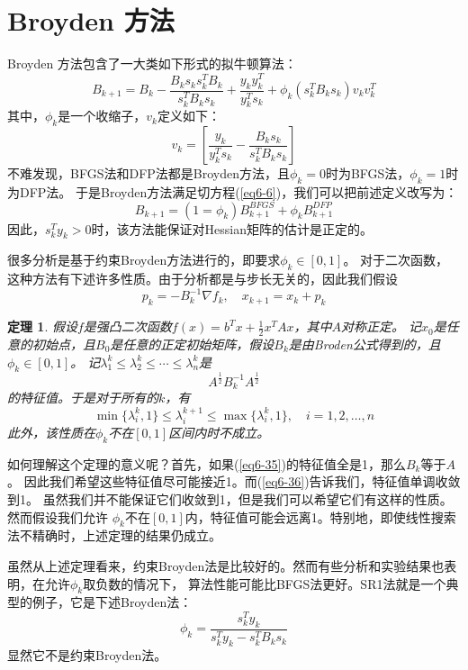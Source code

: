 \documentclass{article}
\newtheorem{thm}{定理}
\begin{document}
\section{Broyden 方法}
Broyden 方法包含了一大类如下形式的拟牛顿算法：
\begin{equation}
  \label{eq6-32}
  B_{k+1} = B_k - \frac{B_ks_ks_k^TB_k}{s_k^TB_ks_k} + \frac{y_ky_k^T}{y_k^Ts_k}
  +\phi_k(s_k^TB_ks_k)v_kv_k^T
\end{equation}
其中，$\phi_k$是一个收缩子，$v_k$定义如下：
\begin{equation}
  \label{eq6-33}
  v_k = \left[ \frac{y_k}{y_k^Ts_k}-\frac{B_ks_k}{s_k^TB_ks_k} \right]
\end{equation}
不难发现，BFGS法和DFP法都是Broyden方法，且$\phi_k = 0$时为BFGS法，$\phi_k = 1$时为DFP法。
于是Broyden方法满足切方程(\ref{eq6-6})，我们可以把前述定义改写为：
\[
  B_{k+1} = (1=\phi_k)B_{k+1}^{BFGS}+\phi_k B_{k+1}^{DFP}
\]
因此，$s_k^Ty_k>0$时，该方法能保证对Hessian矩阵的估计是正定的。

很多分析是基于约束Broyden方法进行的，即要求$\phi_k \in [0,1]$。
对于二次函数，这种方法有下述许多性质。由于分析都是与步长无关的，因此我们假设
\begin{equation}
  \label{eq6-34}
  p_k = -B_k^{-1}\nabla f_k, \quad x_{k+1} = x_k + p_k
\end{equation}
\begin{thm}
  假设$f$是强凸二次函数$f(x) = b^Tx + \frac12 x^TAx$，其中$A$对称正定。
  记$x_0$是任意的初始点，且$B_0$是任意的正定初始矩阵，假设$B_k$是由Broden公式得到的，且$\phi_k\in[0,1]$。
  记$\lambda_1^k \le \lambda_2^k \le\cdots\le \lambda_n^k$是
  \begin{equation}
    \label{eq6-35}
    A^{\frac12}B_k^{-1}A^{\frac12}
  \end{equation}
  的特征值。于是对于所有的$k$，有
  \begin{equation}
    \label{eq6-36}
    \min\{\lambda_i^k,1\}\le \lambda_i^{k+1} \le \max\{\lambda_i^k,1\},
    \quad i = 1,2,\dots,n
  \end{equation}
  此外，该性质在$\phi_k$不在$[0,1]$区间内时不成立。
\end{thm}
如何理解这个定理的意义呢？首先，如果(\ref{eq6-35})的特征值全是1，那么$B_k$等于$A$。
因此我们希望这些特征值尽可能接近1。而(\ref{eq6-36})告诉我们，特征值单调收敛到1。
虽然我们并不能保证它们收敛到1，但是我们可以希望它们有这样的性质。然而假设我们允许
$\phi_k$不在$[0,1]$内，特征值可能会远离1。特别地，即使线性搜索法不精确时，上述定理的结果仍成立。

虽然从上述定理看来，约束Broyden法是比较好的。然而有些分析和实验结果也表明，在允许$\phi_k$取负数的情况下，
算法性能可能比BFGS法更好。SR1法就是一个典型的例子，它是下述Broyden法：
\[
  \phi_k = \frac{s_k^Ty_k}{s_k^Ty_k - s_k^TB_ks_k}
\]
显然它不是约束Broyden法。
\end{document}
